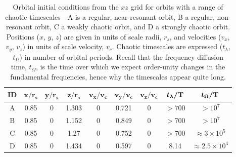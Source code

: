\documentclass{mn2e}
\newcommand{\bs}[1]{\boldsymbol{#1}}
\newcommand{\periods}{\ensuremath{{\rm T}}}
\begin{document}
\begin{table}[ht]
\begin{center}
	\begin{tabular}{c | c c c c c c | c c}
		{\bf ID} & $\bs{x/r_s}$ & $\bs{y/r_s}$ & $\bs{z/r_s}$ & $\bs{v_x/v_c}$ & $\bs{v_y/v_c}$ & $\bs{v_z/v_c}$ & $\bs{t_\lambda/\periods}$ & $\bs{t_\Omega/\periods}$ \\\toprule
A & 0.85 & 0 & 1.303 & 0 & 0.721 & 0 & $>700$ & $>10^7$ \\
\midrule
B & 0.85 & 0 & 1.152 & 0 & 0.849 & 0 & $>700$ & $>10^7$\\
\midrule
C & 0.85 & 0 & 1.27 & 0 & 0.752 & 0 & $>700$ & $\approx 3\times10^5$\\
\midrule
D & 0.85 & 0 & 1.434 & 0 & 0.597 & 0 & 8.14 & $\approx 2.5\times10^4$\\
		\bottomrule
		\end{tabular}
	\caption{Orbital initial conditions from the $xz$ grid for orbits with a range of chaotic timescales---A is a regular, near-resonant orbit, B a regular, non-resonant orbit, C a weakly chaotic orbit, and D a strongly chaotic orbit. Positions ($x$, $y$, $z$) are given in units of scale radii, $r_s$, and velocities ($v_x$, $v_y$, $v_z$) in units of scale velocity, $v_c$. Chaotic timescales are expressed ($t_\lambda$, $t_\Omega$) in number of orbital periods. Recall that the frequency diffusion time, $t_\Omega$, is the time over which we expect order-unity changes in the fundamental frequencies, hence why the timescales appear quite long. \label{tbl:orbit-info}}
\end{center}
\end{table}
\end{document}
